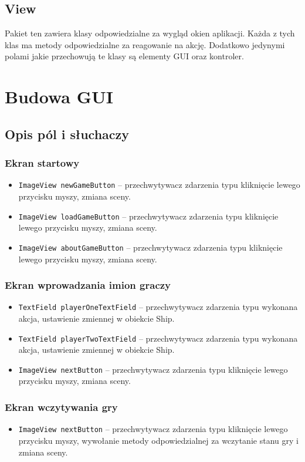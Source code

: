 \documentclass[a4paper]{article}
\newcommand{\prog}{\texttt}
\begin{document}
\subsection{View}
Pakiet ten zawiera klasy odpowiedzialne za wygląd okien aplikacji. Każda z tych klas ma metody odpowiedzialne za reagowanie na akcję. Dodatkowo jedynymi polami jakie przechowują te klasy są elementy GUI oraz kontroler.

\section{Budowa GUI}
\subsection{Opis pól i słuchaczy}
\subsubsection{Ekran startowy}
\begin{itemize}
    \item \prog{ImageView newGameButton} -- przechwytywacz zdarzenia typu kliknięcie lewego przycisku myszy, zmiana sceny.
    \item \prog{ImageView loadGameButton} -- przechwytywacz zdarzenia typu kliknięcie lewego przycisku myszy, zmiana sceny.
    \item \prog{ImageView aboutGameButton} -- przechwytywacz zdarzenia typu kliknięcie lewego przycisku myszy, zmiana sceny.
\end{itemize}

\subsubsection{Ekran wprowadzania imion graczy}
\begin{itemize}
    \item \prog{TextField playerOneTextField} -- przechwytywacz zdarzenia typu wykonana akcja, ustawienie zmiennej w obiekcie Ship.
    \item \prog{TextField playerTwoTextField} -- przechwytywacz zdarzenia typu wykonana akcja, ustawienie zmiennej w obiekcie Ship.
    \item \prog{ImageView nextButton} -- przechwytywacz zdarzenia typu kliknięcie lewego przycisku myszy, zmiana sceny.
\end{itemize}

\subsubsection{Ekran wczytywania gry}
\begin{itemize}
    \item \prog{ImageView nextButton} -- przechwytywacz zdarzenia typu kliknięcie lewego przycisku myszy, wywołanie metody odpowiedzialnej za wczytanie stanu gry i zmiana sceny.
\end{itemize}
\end{document}
